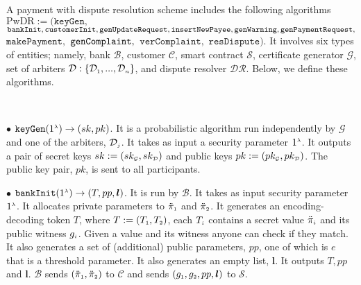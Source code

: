 
\begin{definition}
A payment with dispute resolution  scheme  includes the following   algorithms $\text{PwDR}:=(\mathtt{keyGen}, $ $\mathtt{bankInit}, \\\mathtt{customerInit},  \mathtt{genUpdateRequest}, \mathtt{insertNewPayee}, \mathtt{genWarning}, \mathtt{genPaymentRequest}, $ $\mathtt{makePayment}, $ $ \mathtt{genComplaint}, \\$ $\mathtt{verComplaint},$ $ \mathtt{resDispute})$. It involves  six   types of entities; namely,  bank $\mathcal{B}$, customer $\mathcal{C}$,  smart contract $\mathcal{S}$,  certificate generator $\mathcal{G}$,   set of arbiters $\mathcal{D}:\{\mathcal{D}_{\scriptscriptstyle 1},..., \mathcal{D}_{\scriptscriptstyle n}\}$, and  dispute resolver $\mathcal{DR}$. Below, we define these algorithms.  

%
\

\item [$\bullet$]  $\mathtt{keyGen}(1^{\scriptscriptstyle \lambda})\rightarrow (sk,pk)$. It is a probabilistic  algorithm run independently by  $\mathcal{G}$ and one of the arbiters, $\mathcal{D}_{\scriptscriptstyle j}$. It takes as input a security parameter $1^{\scriptscriptstyle \lambda}$. It outputs a pair of secret keys $sk:=(sk_{\scriptscriptstyle\mathcal {G}},sk_{\scriptscriptstyle\mathcal {D}})$ and public keys $pk:=(pk_{\scriptscriptstyle\mathcal {G}},pk_{\scriptscriptstyle\mathcal {D}})$. The public key pair, $pk$, is sent to all participants. 



\item[$\bullet$] $\mathtt{bankInit}(1^{\scriptscriptstyle \lambda})\rightarrow (T, pp, \bm{l})$. It is  run by  $\mathcal{B}$. It takes as input  security parameter $1^{\scriptscriptstyle \lambda}$.  It allocates private parameters to  $\ddot\pi_{\scriptscriptstyle 1}$ and $\ddot\pi_{\scriptscriptstyle 2}$. It generates an encoding-decoding token $T$, where  $T:=(T_{\scriptscriptstyle 1},T_{\scriptscriptstyle 2})$,  each $T_{\scriptscriptstyle i}$  contains  a secret value $\ddot\pi_{\scriptscriptstyle i}$ and its public witness $g_{\scriptscriptstyle i}$.    Given a  value and its witness anyone can check if they match. It also generates a set of (additional) public parameters,  $pp$, one of which is $e$ that is a threshold parameter.  It also generates an  empty list, $\bm{l}$. It outputs $T, pp$ and $\bm l$.  $\mathcal{B}$ sends $(\ddot\pi_{\scriptscriptstyle 1}, \ddot\pi_{\scriptscriptstyle 2})$ to $\mathcal{C}$ and sends $(g_{\scriptscriptstyle 1}, g_{\scriptscriptstyle 2},  pp, \bm {l})$ to $\mathcal{S}$.



\end{definition}
